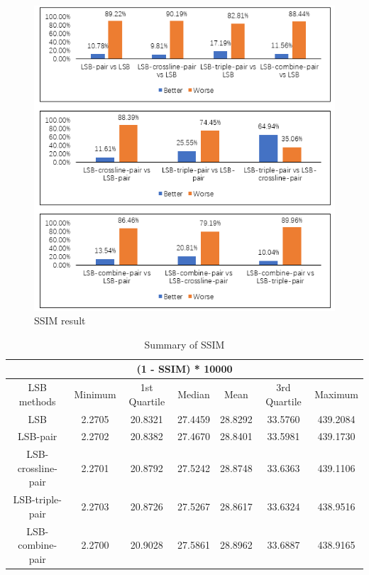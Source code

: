 \begin{figure}[h]
\includegraphics[width=\columnwidth]{image/SSIM.PNG}
\caption{SSIM result}
\label{fig:figure}
\end{figure} 


\begin{table}
\centering
\begin{tabular}{ |c|c|c|c|c|c|c|  }
 \hline
 \multicolumn{7}{|c|}{(1 - SSIM) * 10000} \\
 \hline
 LSB methods    &Minimum&1st Quartile	&Median	&Mean	&3rd Quartile	        &Maximum\\
 \hline
 LSB	            &2.2705	&20.8321	&27.4459	    &28.8292	&33.5760	&439.2084\\
 \hline
 LSB-pair	        &2.2702	&20.8382	&27.4670	    &28.8401	&33.5981	&439.1730\\
 \hline
 LSB-crossline-pair	&2.2701 &20.8792	&27.5242	    &28.8748	&33.6363	&439.1106\\
 \hline
 LSB-triple-pair	&2.2703	&20.8726	&27.5267	    &28.8617	&33.6324	&438.9516\\
 \hline
 LSB-combine-pair	&2.2700	&20.9028	&27.5861	    &28.8962	&33.6887	&438.9165\\
 \hline
\end{tabular}
 \caption{Summary of SSIM}
\end{table}


